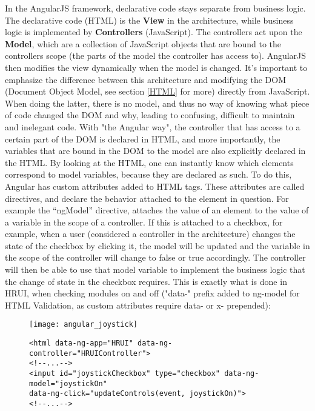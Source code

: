 In the AngularJS framework, declarative code stays separate from business logic. The declarative code (HTML) is the \textbf{View} in the architecture, while business logic is implemented by \textbf{Controllers} (JavaScript). The controllers act upon the \textbf{Model}, which are a collection of JavaScript objects that are bound to the controllers scope (the parts of the model the controller has access to). AngularJS then modifies the view dynamically when the model is changed. It's important to emphasize the difference between this architecture and modifying the DOM (Document Object Model, see section \ref{HTML} for more) directly from JavaScript. When doing the latter, there is no model, and thus no way of knowing what piece of code changed the DOM and why, leading to confusing, difficult to maintain and inelegant code. With "the Angular way", the controller that has access to a certain part of the DOM is declared in HTML, and more importantly, the variables that are bound in the DOM to the model are also explicitly declared in the HTML. By looking at the HTML, one can instantly know which elements correspond to model variables, because they are declared as such. To do this, Angular has custom attributes added to HTML tags. These attributes are called directives, and declare the behavior attached to the element in question. For example the ``ngModel'' directive, attaches the value of an element to the value of a variable in the scope of a controller. If this is attached to a checkbox, for example, when a user (considered a controller in the architecture) changes the state of the checkbox by clicking it, the model will be updated and the variable in the scope of the controller will change to false or true accordingly. The controller will then be able to use that model variable to implement the business logic that the change of state in the checkbox requires. This is exactly what is done in HRUI, when checking modules on and off ("data-" prefix added to ng-model for HTML Validation, as custom attributes require data- or x- prepended):
\begin{figure}[H]
  \captionsetup{justification=centering}
  \begin{center}
    \texttt{[image: angular\_joystick]}
  \end{center}
\end{figure}
\begin{figure}[H]
\centering
\captionsetup{justification=centering}
\begin{verbatim}
<html data-ng-app="HRUI" data-ng-controller="HRUIController">
<!--...-->
<input id="joystickCheckbox" type="checkbox" data-ng-model="joystickOn"
data-ng-click="updateControls(event, joystickOn)">
<!--...-->
\end{verbatim}
\end{figure}
